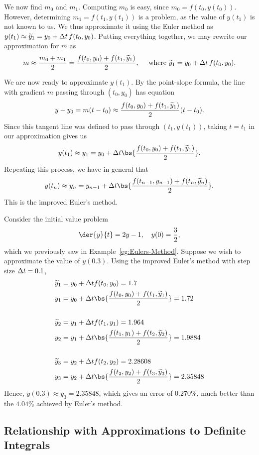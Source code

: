 We now find $m_0$ and $m_1$. Computing $m_0$ is easy, since $m_0 = f(t_0, y(t_0))$. However, determining $m_1 = f(t_1, y(t_1))$ is a problem, as the value of $y(t_1)$ is not known to us. We thus approximate it using the Euler method as $y(t_1) \approx \widetilde{y}_1 = y_0 + \Delta t \, f(t_0, y_0)$. Putting everything together, we may rewrite our approximation for $m$ as \[m \approx \frac{m_0 + m_1}{2} = \frac{f(t_0, y_0) + f(t_1, \widetilde{y}_1)}{2}, \quad \text{ where }\widetilde{y}_1 = y_0 + \Delta t \, f(t_0, y_0).\]

We are now ready to approximate $y(t_1)$. By the point-slope formula, the line with gradient $m$ passing through $(t_0, y_0)$ has equation \[y - y_0 = m (t - t_0) \approx \frac{f(t_0, y_0) + f(t_1, \widetilde{y}_1)}{2} (t - t_0).\] Since this tangent line was defined to pass through $(t_1, y(t_1))$, taking $t = t_1$ in our approximation gives us \[y(t_1) \approx y_1 = y_0 + \D t \bs{\frac{f(t_0, y_0) + f(t_1, \wt{y}_1)}{2}}.\] Repeating this process, we have in general that \[y(t_n) \approx y_{n} = y_{n-1} + \D t \bs{\frac{f(t_{n-1}, y_{n-1}) + f(t_{n}, \wt{y}_{n})}{2}}.\] This is the improved Euler's method.

\begin{example}
    Consider the initial value problem \[\der{y}{t} = 2y - 1, \quad y(0) = \frac32,\] which we previously saw in Example~\ref{eg:Eulers-Method}. Suppose we wish to approximate the value of $y(0.3)$. Using the improved Euler's method with step size $\Delta t = 0.1$,
    \begin{align*}
        \wt{y}_1 &= y_0 + \D t f(t_0, y_0) = 1.7\\
        y_1 &= y_0 + \D t \bs{\frac{f(t_0, y_0) + f(t_1, \wt{y}_1)}{2}} = 1.72 \\ \\
        \wt{y}_2 &= y_1 + \D t f(t_1, y_1) = 1.964\\
        y_2 &= y_1 + \D t \bs{\frac{f(t_1, y_1) + f(t_2, \wt{y}_2)}{2}} = 1.9884 \\ \\
        \wt{y}_3 &= y_2 + \D t f(t_2, y_2) = 2.28608\\
        y_3 &= y_2 + \D t \bs{\frac{f(t_2, y_2) + f(t_3, \wt{y}_3)}{2}} = 2.35848
    \end{align*}
    Hence, $y(0.3) \approx y_3 = 2.35848$, which gives an error of $0.270\%$, much better than the $4.04\%$ achieved by Euler's method.
\end{example}

\subsection{Relationship with Approximations to Definite Integrals}

